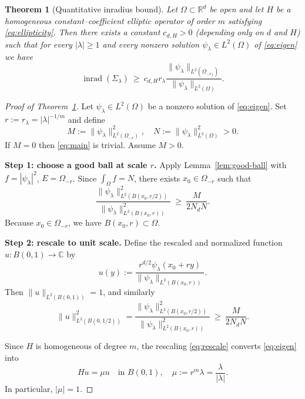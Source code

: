 \documentclass[10pt,a4paper]{amsart}
\newtheorem{thm}{Theorem}
\newcommand{\C}{\mathbb{C}}
\newcommand{\R}{\mathbb{R}}
\newcommand{\inrad}{\operatorname{inrad}}
\begin{document}
\begin{thm}[Quantitative inradius bound]\label{thm:main}
Let $\Omega\subset\R^d$ be open and let $H$ be a homogeneous constant--coefficient elliptic operator of order $m$ satisfying \eqref{eq:ellipticity}.
Then there exists a constant $c_{d,H}>0$ (depending only on $d$ and $H$) such that for every $|\lambda|\ge 1$ and every nonzero solution $\psi_\lambda\in L^2(\Omega)$ of \eqref{eq:eigen} we have
\begin{equation}\label{eq:main}
\inrad(\Sigma_\lambda)\ \ge\ c_{d,H} r_\lambda 
\frac{\|\psi_\lambda\|_{L^2(\Omega_{-r_\lambda})}}{\|\psi_\lambda\|_{L^2(\Omega)}}.
\end{equation}
\end{thm}

\begin{proof}[Proof of Theorem~\ref{thm:main}]
Let $\psi_\lambda\in L^2(\Omega)$ be a nonzero solution of \eqref{eq:eigen}.
Set $r := r_\lambda = |\lambda|^{-1/m}$ and define
$$
M := \|\psi_\lambda\|_{L^2(\Omega_{-r})}^2,\quad
N := \|\psi_\lambda\|_{L^2(\Omega)}^2>0.
$$
If $M = 0$ then \eqref{eq:main} is trivial. Assume $M>0$.

\textbf{Step 1: choose a good ball at scale $r$.}
Apply Lemma~\ref{lem:good-ball} with $f = |\psi_\lambda|^2$, $E = \Omega_{-r}$.
Since $\int_\Omega f = N$, there exists $x_0\in\Omega_{-r}$ such that
\begin{equation}\label{eq:good-ratio}
\frac{\|\psi_\lambda\|_{L^2(B(x_0,r/2))}^2}{\|\psi_\lambda\|_{L^2(B(x_0,r))}^2}
\ \ge\ \frac{M}{2N_d N}.
\end{equation}
Because $x_0\in\Omega_{-r}$, we have $B(x_0,r)\subset\Omega$.

\textbf{Step 2: rescale to unit scale.}
Define the rescaled and normalized function $u:B(0,1)\to\C$ by
\begin{equation}\label{eq:rescale}
u(y) := \frac{r^{d/2} \psi_\lambda(x_0+r y)}{\|\psi_\lambda\|_{L^2(B(x_0,r))}}.
\end{equation}
Then $\|u\|_{L^2(B(0,1))} = 1$, and similarly
\begin{equation}\label{eq:u-half}
\|u\|_{L^2(B(0,1/2))}^2
 = \frac{\|\psi_\lambda\|_{L^2(B(x_0,r/2))}^2}{\|\psi_\lambda\|_{L^2(B(x_0,r))}^2}
\ \ge\ \frac{M}{2N_d N}.
\end{equation}

Since $H$ is homogeneous of degree $m$, the rescaling \eqref{eq:rescale} converts \eqref{eq:eigen} into
\begin{equation}\label{eq:scaled-eqn}
Hu = \mu u\quad\text{in }B(0,1),
\quad \mu := r^m\lambda = \frac{\lambda}{|\lambda|}.
\end{equation}
In particular, $|\mu| = 1$.


\end{proof}
\end{document}
